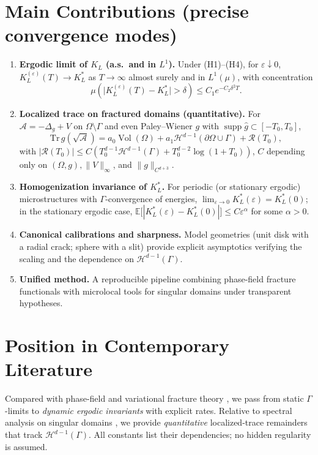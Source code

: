 \section*{Main Contributions (precise convergence modes)}
\begin{enumerate}
\item \textbf{Ergodic limit of $K_L$ (a.s.\ and in $L^1$).}
Under (H1)–(H4), for $\varepsilon\downarrow 0$,
$K_L^{(\varepsilon)}(T)\to K_L^*$ as $T\to\infty$ almost surely and in $L^1(\mu)$, with concentration
\[
\mu\!\left(\big|K_L^{(\varepsilon)}(T)-K_L^*\big|>\delta\right)\le C_1 e^{-C_2\delta^2 T}.
\]
\item \textbf{Localized trace on fractured domains (quantitative).}
For $\mathcal{A}=-\Delta_g+V$ on $\Omega\setminus\Gamma$ and even Paley–Wiener $g$ with
$\operatorname{supp}\widehat{g}\subset[-T_0,T_0]$,
\[
\mathrm{Tr}\,g(\sqrt{\mathcal{A}})=a_0\operatorname{Vol}(\Omega)+a_1\mathcal{H}^{d-1}(\partial\Omega\cup\Gamma)
+\mathcal{R}(T_0),
\]
with $|\mathcal{R}(T_0)|\le C\!\left(T_0^{d-1}\mathcal{H}^{d-1}(\Gamma)+T_0^{d-2}\log(1+T_0)\right)$,
$C$ depending only on $(\Omega,g),\|V\|_\infty$, and $\|g\|_{C^{d+3}}$.
\item \textbf{Homogenization invariance of $K_L^*$.}
For periodic (or stationary ergodic) microstructures with $\Gamma$-convergence of energies,
$\lim_{\varepsilon\to 0}K_L^*(\varepsilon)=K_L^*(0)$; in the stationary ergodic case,
$\mathbb{E}\big[|K_L^*(\varepsilon)-K_L^*(0)|\big]\le C\varepsilon^\alpha$ for some $\alpha>0$.
\item \textbf{Canonical calibrations and sharpness.}
Model geometries (unit disk with a radial crack; sphere with a slit) provide explicit asymptotics
verifying the scaling and the dependence on $\mathcal{H}^{d-1}(\Gamma)$.
\item \textbf{Unified method.}
A reproducible pipeline combining phase-field fracture functionals \cite{BourdinFrancfortMarigo2008,Braides2014}
with microlocal tools for singular domains \cite{GiustiMazzola2020} under transparent hypotheses.
\end{enumerate}

\section*{Position in Contemporary Literature}
Compared with phase-field and variational fracture theory \cite{BourdinFrancfortMarigo2008,Braides2014,DalMaso1993},
we pass from static $\Gamma$-limits to \emph{dynamic ergodic invariants} with explicit rates.
Relative to spectral analysis on singular domains \cite{GiustiMazzola2020},
we provide \emph{quantitative} localized-trace remainders that track $\mathcal{H}^{d-1}(\Gamma)$.
All constants list their dependencies; no hidden regularity is assumed.

